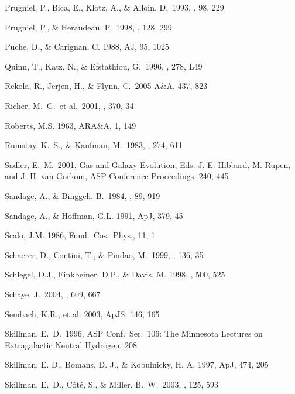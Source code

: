 \documentclass[12pt,onecolumn]{emulateapj}
\begin{document}
\begin{thebibliography}{}
Prugniel, P., Bica, E., Klotz, A., \& Alloin, D.\ 1993, \aaps, 98, 229 

Prugniel, P., \& Heraudeau, P.\ 1998, \aaps, 128, 299 

Puche, D., \& Carignan, C. 1988, AJ, 95, 1025

Quinn, T., Katz, N., \& Efstathiou, G.\ 1996, \mnras, 278, L49 

Rekola, R., Jerjen, H., \& Flynn, C.\ 2005 A\&A, 437, 823

Richer, M.~G.~et al.\ 2001, \aap, 370, 34 

Roberts, M.S. 1963, ARA\&A, 1, 149

Rumstay, K.~S., \& Kaufman, M.\ 1983, \apj, 274, 611 

Sadler, E.~M.\ 2001, Gas and Galaxy Evolution, 
Eds. J. E. Hibbard, M. Rupen, and J. H. van Gorkom,
ASP Conference Proceedings, 240, 445 

Sandage, A., \& Binggeli, B.\ 1984, \aj, 89, 919

Sandage, A., \& Hoffman, G.L. 1991, ApJ, 379, 45

Scalo, J.M. 1986, Fund.\ Cos.\ Phys., 11, 1

Schaerer, D., Contini, T., \& Pindao, M.\ 1999, \aaps, 136, 35 

Schlegel, D.J., Finkbeiner, D.P., \& Davis, M. 1998, \apj , 500, 525

Schaye, J.\ 2004, \apj, 609, 667 

Sembach, K.R., et al. 2003, ApJS, 146, 165

Skillman, E.~D.\ 1996, ASP Conf.~Ser.~106: 
The Minnesota Lectures on Extragalactic Neutral Hydrogen, 208 

Skillman, E. D., Bomans, D. J., \& Kobulnicky, H. A.  
1997, ApJ, 474, 205

Skillman, E.~D., C{\^o}t{\'e}, S., \& Miller, B.~W.\ 2003, \aj, 125, 593


\end{thebibliography}
\end{document}
